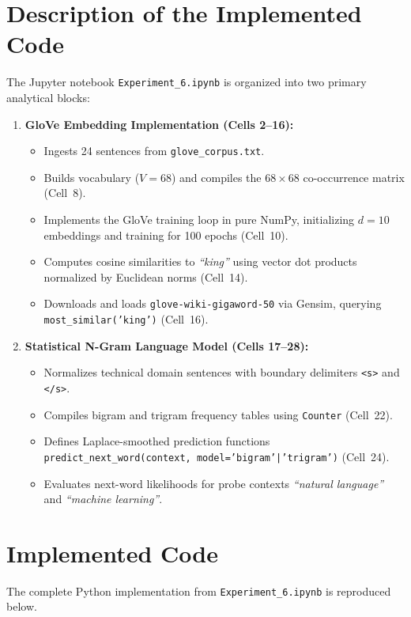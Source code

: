 \documentclass[12pt,a4paper]{report}
\begin{document}
\section{Description of the Implemented Code}
The Jupyter notebook \texttt{Experiment\_6.ipynb} is organized into two primary analytical blocks:
\begin{enumerate}
    \item \textbf{GloVe Embedding Implementation (Cells 2--16):}
    \begin{itemize}
        \item Ingests 24 sentences from \texttt{glove\_corpus.txt}.
        \item Builds vocabulary ($V=68$) and compiles the $68 \times 68$ co-occurrence matrix (Cell~8).
        \item Implements the GloVe training loop in pure NumPy, initializing $d=10$ embeddings and training for 100 epochs (Cell~10).
        \item Computes cosine similarities to \textit{``king''} using vector dot products normalized by Euclidean norms (Cell~14).
        \item Downloads and loads \texttt{glove-wiki-gigaword-50} via Gensim, querying \texttt{most\_similar('king')} (Cell~16).
    \end{itemize}
    \item \textbf{Statistical N-Gram Language Model (Cells 17--28):}
    \begin{itemize}
        \item Normalizes technical domain sentences with boundary delimiters \texttt{<s>} and \texttt{</s>}.
        \item Compiles bigram and trigram frequency tables using \texttt{Counter} (Cell~22).
        \item Defines Laplace-smoothed prediction functions \texttt{predict\_next\_word(context, model='bigram'|'trigram')} (Cell~24).
        \item Evaluates next-word likelihoods for probe contexts \textit{``natural language''} and \textit{``machine learning''}.
    \end{itemize}
\end{enumerate}

\section{Implemented Code}
The complete Python implementation from \texttt{Experiment\_6.ipynb} is reproduced below.
\end{document}

